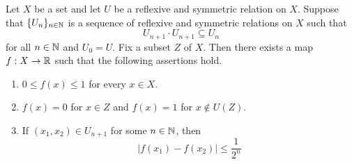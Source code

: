 \begin{theorem}\label{theorem:Urysohn_lemma}
	Let $X$ be a set and let $U$ be a reflexive and symmetric relation on $X$. Suppose that $\{U_n\}_{n\in {\mathbb N}}$ is a sequence of reflexive and symmetric relations on $X$ such that
	$$U_{n+1}\cdot U_{n+1} \subseteq U_n$$
	for all $n \in {\mathbb N}$ and $U_0 = U$. Fix a subset $Z$ of $X$. Then there exists a map $f: X\rightarrow {\mathbb R}$ such that the following assertions hold.
	\begin{enumerate}[label=\emph{\textbf{(\arabic*)}}, leftmargin=3.0em]
		\item $0\leq f(x) \leq 1$ for every $x \in X$.
		\item $f(x) = 0$ for $x \in Z$ and $f(x) = 1$ for $x \not \in U(Z)$.
		\item If $(x_1,x_2) \in U_{n+1}$ for some $n \in {\mathbb N}$, then
		      $$|f(x_1) - f(x_2)| \leq \frac{1}{2^n}$$
	\end{enumerate}
\end{theorem}
